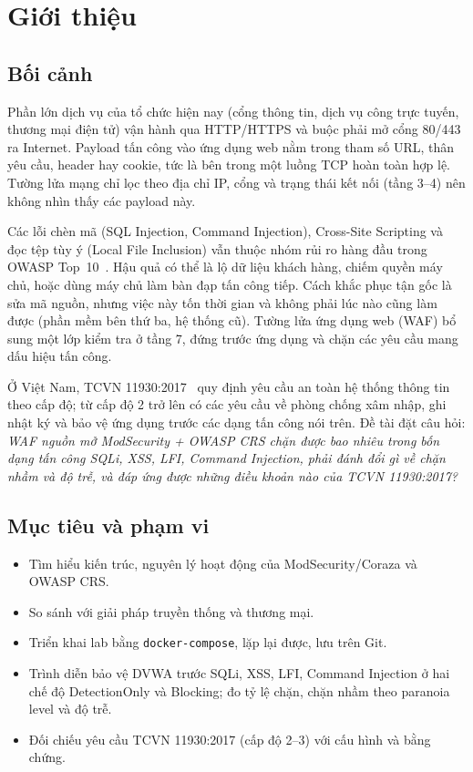 \chapter{Giới thiệu}

\section{Bối cảnh}
Phần lớn dịch vụ của tổ chức hiện nay (cổng thông tin, dịch vụ công trực tuyến, thương mại điện tử) vận hành qua HTTP/HTTPS và buộc phải mở cổng 80/443 ra Internet. Payload tấn công vào ứng dụng web nằm trong tham số URL, thân yêu cầu, header hay cookie, tức là bên trong một luồng TCP hoàn toàn hợp lệ. Tường lửa mạng chỉ lọc theo địa chỉ IP, cổng và trạng thái kết nối (tầng 3--4) nên không nhìn thấy các payload này.

Các lỗi chèn mã (SQL Injection, Command Injection), Cross-Site Scripting và đọc tệp tùy ý (Local File Inclusion) vẫn thuộc nhóm rủi ro hàng đầu trong OWASP Top~10~\cite{owasptop10}. Hậu quả có thể là lộ dữ liệu khách hàng, chiếm quyền máy chủ, hoặc dùng máy chủ làm bàn đạp tấn công tiếp. Cách khắc phục tận gốc là sửa mã nguồn, nhưng việc này tốn thời gian và không phải lúc nào cũng làm được (phần mềm bên thứ ba, hệ thống cũ). Tường lửa ứng dụng web (WAF) bổ sung một lớp kiểm tra ở tầng 7, đứng trước ứng dụng và chặn các yêu cầu mang dấu hiệu tấn công.

Ở Việt Nam, TCVN 11930:2017~\cite{tcvn11930} quy định yêu cầu an toàn hệ thống thông tin theo cấp độ; từ cấp độ 2 trở lên có các yêu cầu về phòng chống xâm nhập, ghi nhật ký và bảo vệ ứng dụng trước các dạng tấn công nói trên. Đề tài đặt câu hỏi: \textit{WAF nguồn mở ModSecurity + OWASP CRS chặn được bao nhiêu trong bốn dạng tấn công SQLi, XSS, LFI, Command Injection, phải đánh đổi gì về chặn nhầm và độ trễ, và đáp ứng được những điều khoản nào của TCVN 11930:2017?}

\section{Mục tiêu và phạm vi}
\begin{itemize}
  \item Tìm hiểu kiến trúc, nguyên lý hoạt động của ModSecurity/Coraza và OWASP CRS.
  \item So sánh với giải pháp truyền thống và thương mại.
  \item Triển khai lab bằng \texttt{docker-compose}, lặp lại được, lưu trên Git.
  \item Trình diễn bảo vệ DVWA trước SQLi, XSS, LFI, Command Injection ở hai chế độ DetectionOnly và Blocking; đo tỷ lệ chặn, chặn nhầm theo paranoia level và độ trễ.
  \item Đối chiếu yêu cầu TCVN 11930:2017 (cấp độ 2--3) với cấu hình và bằng chứng.
\end{itemize}

